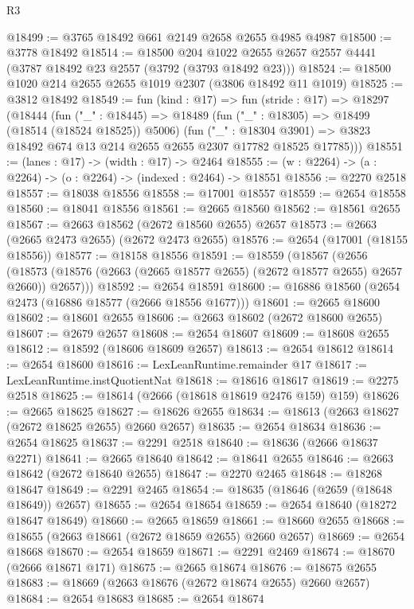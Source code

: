 \begin{lexlean}{R3}
\begin{coremodule}
@18499 := @3765 @18492 @661 @2149 @2658 @2655 @4985 @4987
@18500 := @3778 @18492
@18514 := @18500
    @204
    @1022
    @2655
    @2657
    @2557
    @4441
    (@3787 @18492 @23 @2557 (@3792 (@3793 @18492 @23)))
@18524 := @18500 @1020 @214 @2655 @2655 @1019 @2307 (@3806 @18492 @11 @1019)
@18525 := @3812 @18492
@18549 := fun (kind : @17) =>
  fun (stride : @17) =>
  @18297
    (@18444
      (fun ("_" : @18445) =>
      @18489
        (fun ("_" : @18305) => @18499 (@18514 (@18524 @18525)) @5006)
        (fun ("_" : @18304 @3901) =>
        @3823 @18492 @674 @13 @214 @2655 @2655 @2307 @17782 @18525 @17785)))
@18551 := (lanes : @17) -> (width : @17) -> @2464
@18555 := (w : @2264) -> (a : @2264) -> (o : @2264) -> (indexed : @2464) -> @18551
@18556 := @2270 @2518
@18557 := @18038 @18556
@18558 := @17001 @18557
@18559 := @2654 @18558
@18560 := @18041 @18556
@18561 := @2665 @18560
@18562 := @18561 @2655
@18567 := @2663 @18562 (@2672 @18560 @2655) @2657
@18573 := @2663 (@2665 @2473 @2655) (@2672 @2473 @2655)
@18576 := @2654 (@17001 (@18155 @18556))
@18577 := @18158 @18556
@18591 := @18559
    (@18567
      (@2656 (@18573 (@18576 (@2663 (@2665 @18577 @2655) (@2672 @18577 @2655) @2657 @2660)) @2657)))
@18592 := @2654 @18591
@18600 := @16886 @18560 (@2654 @2473 (@16886 @18577 (@2666 @18556 @1677)))
@18601 := @2665 @18600
@18602 := @18601 @2655
@18606 := @2663 @18602 (@2672 @18600 @2655)
@18607 := @2679 @2657
@18608 := @2654 @18607
@18609 := @18608 @2655
@18612 := @18592 (@18606 @18609 @2657)
@18613 := @2654 @18612
@18614 := @2654 @18600
@18616 := LexLeanRuntime.remainder @17
@18617 := LexLeanRuntime.instQuotientNat
@18618 := @18616 @18617
@18619 := @2275 @2518
@18625 := @18614 (@2666 (@18618 @18619 @2476 @159) @159)
@18626 := @2665 @18625
@18627 := @18626 @2655
@18634 := @18613 (@2663 @18627 (@2672 @18625 @2655) @2660 @2657)
@18635 := @2654 @18634
@18636 := @2654 @18625
@18637 := @2291 @2518
@18640 := @18636 (@2666 @18637 @2271)
@18641 := @2665 @18640
@18642 := @18641 @2655
@18646 := @2663 @18642 (@2672 @18640 @2655)
@18647 := @2270 @2465
@18648 := @18268 @18647
@18649 := @2291 @2465
@18654 := @18635 (@18646 (@2659 (@18648 @18649)) @2657)
@18655 := @2654 @18654
@18659 := @2654 @18640 (@18272 @18647 @18649)
@18660 := @2665 @18659
@18661 := @18660 @2655
@18668 := @18655 (@2663 @18661 (@2672 @18659 @2655) @2660 @2657)
@18669 := @2654 @18668
@18670 := @2654 @18659
@18671 := @2291 @2469
@18674 := @18670 (@2666 @18671 @171)
@18675 := @2665 @18674
@18676 := @18675 @2655
@18683 := @18669 (@2663 @18676 (@2672 @18674 @2655) @2660 @2657)
@18684 := @2654 @18683
@18685 := @2654 @18674

\end{coremodule}
\end{lexlean}
